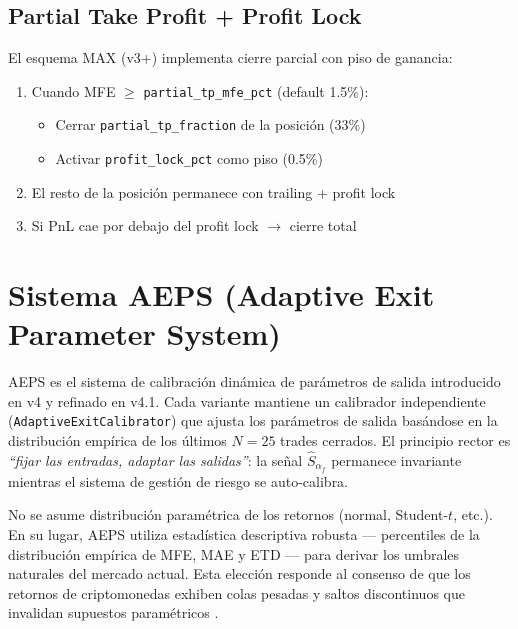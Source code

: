 \documentclass[11pt,a4paper]{article}
\newcommand{\score}{\hat{S}_{\alpha_f}}
\newcommand{\code}[1]{\texttt{\small #1}}
\newcommand{\param}[1]{\texttt{\small\color{cpurple}#1}}
\begin{document}
\subsection{Partial Take Profit + Profit Lock}

El esquema MAX (v3+) implementa cierre parcial con piso de ganancia:

\begin{enumerate}[leftmargin=2em]
\item Cuando MFE $\geq$ \param{partial\_tp\_mfe\_pct} (default 1.5\%):
  \begin{itemize}
    \item Cerrar \param{partial\_tp\_fraction} de la posici\'on (33\%)
    \item Activar \param{profit\_lock\_pct} como piso (0.5\%)
  \end{itemize}
\item El resto de la posici\'on permanece con trailing + profit lock
\item Si PnL cae por debajo del profit lock $\to$ cierre total
\end{enumerate}


\section{Sistema AEPS (Adaptive Exit Parameter System)}
\label{sec:aeps}

AEPS es el sistema de calibraci\'on din\'amica de par\'ametros de salida
introducido en v4 y refinado en v4.1. Cada variante mantiene un calibrador
independiente (\code{AdaptiveExitCalibrator}) que ajusta los par\'ametros
de salida bas\'andose en la distribuci\'on emp\'irica de los \'ultimos
$N=25$ trades cerrados. El principio rector es \textit{``fijar las
entradas, adaptar las salidas''}: la se\~nal $\score$ permanece
invariante mientras el sistema de gesti\'on de riesgo se auto-calibra.

No se asume distribuci\'on param\'etrica de los retornos (normal, Student-$t$,
etc.). En su lugar, AEPS utiliza estad\'istica descriptiva robusta
--- percentiles de la distribuci\'on emp\'irica de MFE, MAE y ETD ---
para derivar los umbrales naturales del mercado actual. Esta elecci\'on
responde al consenso de que los retornos de criptomonedas exhiben
colas pesadas y saltos discontinuos que invalidan supuestos
param\'etricos \cite{palazzi2025crypto}.
\end{document}
